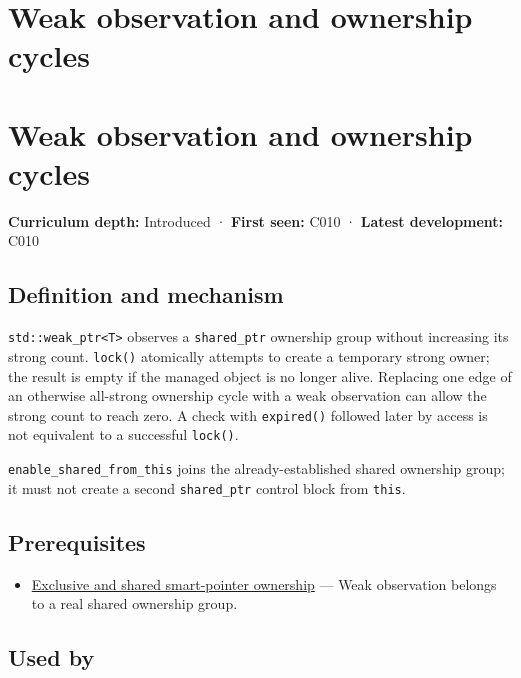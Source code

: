 \hypertarget{appendix-b9548675eb2b}{}
\section*{Weak observation and ownership cycles}
\section{Weak observation and ownership cycles}\label{appendix-b9548675eb2b-weak-observation-and-ownership-cycles}

\textbf{Curriculum depth:} Introduced · \textbf{First seen:} C010 · \textbf{Latest development:} C010

\subsection{Definition and mechanism}\label{appendix-b9548675eb2b-definition-and-mechanism}

\texttt{std::weak\_ptr\textless{}T\textgreater{}} observes a \texttt{shared\_ptr} ownership group without increasing its strong count. \texttt{lock()} atomically attempts to create a temporary strong owner; the result is empty if the managed object is no longer alive. Replacing one edge of an otherwise all-strong ownership cycle with a weak observation can allow the strong count to reach zero. A check with \texttt{expired()} followed later by access is not equivalent to a successful \texttt{lock()}.

\texttt{enable\_shared\_from\_this} joins the already-established shared ownership group; it must not create a second \texttt{shared\_ptr} control block from \texttt{this}.

\subsection{Prerequisites}\label{appendix-b9548675eb2b-prerequisites}

\begin{itemize}
\tightlist
\item
  \hyperref[appendix-51602cabe815]{Exclusive and shared smart-pointer ownership} --- Weak observation belongs to a real shared ownership group.
\end{itemize}

\subsection{Used by}\label{appendix-b9548675eb2b-used-by}

